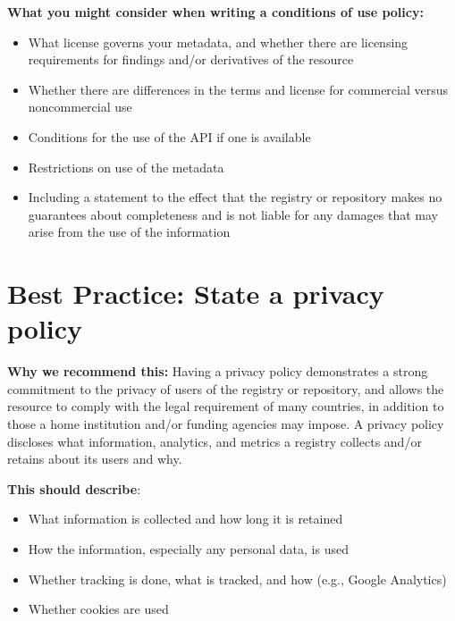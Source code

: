 \documentclass[11pt]{article}
\begin{document}
\textbf{What you might consider when writing a conditions of use policy:}

\begin{itemize}
\item What license governs your metadata, and whether there are licensing requirements for findings and/or derivatives of the resource

\item Whether there are differences in the terms and license for commercial versus noncommercial use

\item Conditions for the use of the API if one is available 

\item Restrictions on use of the metadata

\item Including a statement to the effect that the registry or repository makes no guarantees about completeness and is not liable for any damages that may arise from the use of the information

\end{itemize}


\section{Best Practice: State a privacy policy}
\label{best-practice-state-a-privacy-policy}

\textbf{Why we recommend this:} Having a privacy policy demonstrates a strong commitment to the privacy of users of the registry or repository, and allows the resource to comply with the legal requirement of many countries, in addition to those a home institution and/or funding agencies may impose. A privacy policy discloses what information, analytics, and metrics a registry collects and/or retains about its users and why.

\textbf{This should describe}:

\begin{itemize}
\item What information is collected and how long it is retained

\item How the information, especially any personal data, is used

\item Whether tracking is done, what is tracked, and how (e.g., Google Analytics)

\item Whether cookies are used

\end{itemize}
\end{document}
